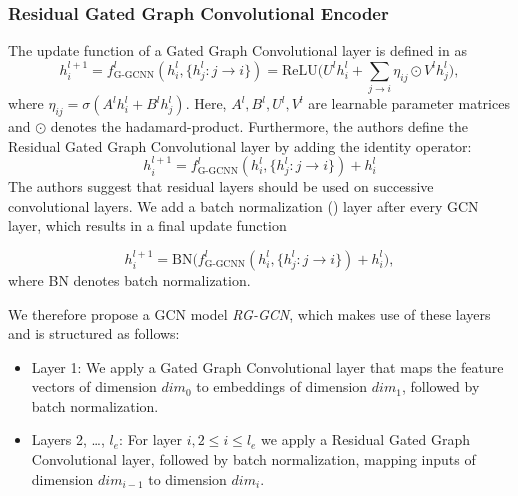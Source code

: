 \documentclass[draft,final]{vutinfth} %
\begin{document}
\subsubsection{Residual Gated Graph Convolutional Encoder}
The update function of a Gated Graph Convolutional layer is defined in \cite{Bresson2017} as 
\[
    h_i^{l+1} = f_{\text{G-GCNN}}^l(h_i^l, \{ h_j^l \colon j \rightarrow i \}) = \text{ReLU} \Big( U^l h_i^l + \sum_{j \rightarrow i} \eta_{ij} \odot V^l h^l_j \Big),
\]
where $\eta_{ij} = \sigma(A^l h_i^l + B^l h_j^l)$. Here, $A^l, B^l, U^l, V^l$ are learnable parameter matrices and $\odot$ denotes the hadamard-product. 
Furthermore, the authors define the Residual Gated Graph Convolutional layer by adding the identity operator: 
\[
    h_i^{l+1} = f_{\text{G-GCNN}}^l(h_i^l, \{ h_j^l \colon j \rightarrow i \}) + h_i^l
\]
The authors suggest that residual layers should be used on successive convolutional layers. 
We add a batch normalization (\cite{IoffeS15}) layer after every GCN layer, which results in a final update function 

\[
    h_i^{l+1} = \text{BN} \Big( f_{\text{G-GCNN}}^l(h_i^l, \{ h_j^l \colon j \rightarrow i \}) + h_i^l \Big),
\]
where BN denotes batch normalization. 

We therefore propose a GCN model \textit{RG-GCN}, which makes use of these layers and is structured as follows: 
\begin{itemize}
    \item Layer 1: We apply a Gated Graph Convolutional layer that maps the feature vectors of dimension $dim_0$ to embeddings of dimension $dim_1$, followed by batch normalization.
    \item Layers 2, \dots, $l_e$: For layer $i, 2 \leq i \leq l_e$ we apply a Residual Gated Graph Convolutional layer, followed by batch normalization, mapping inputs of dimension $dim_{i-1}$ to dimension $dim_i$. 
\end{itemize}

\end{document}
